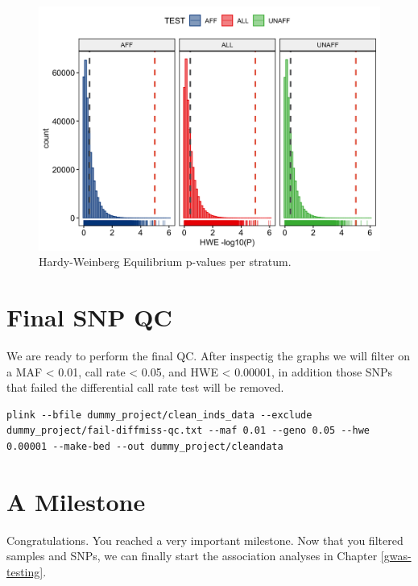 \documentclass[
]{book}
\begin{document}
\begin{figure}[H]

{\centering \includegraphics[width=18.67in]{img/_gwas_dummy/show-hwe} 

}

\caption{Hardy-Weinberg Equilibrium p-values per stratum.}\label{fig:show-hwe}
\end{figure}

\hypertarget{final-snp-qc}{%
\section{Final SNP QC}\label{final-snp-qc}}

We are ready to perform the final QC. After inspectig the graphs we will filter on a MAF \textless{} 0.01, call rate \textless{} 0.05, and HWE \textless{} 0.00001, in addition those SNPs that failed the differential call rate test will be removed.

\begin{lstlisting}
plink --bfile dummy_project/clean_inds_data --exclude dummy_project/fail-diffmiss-qc.txt --maf 0.01 --geno 0.05 --hwe 0.00001 --make-bed --out dummy_project/cleandata
\end{lstlisting}

\hypertarget{a-milestone}{%
\section{A Milestone}\label{a-milestone}}

Congratulations. You reached a very important milestone. Now that you filtered samples and SNPs, we can finally start the association analyses in Chapter \ref{gwas-testing}.
\end{document}
